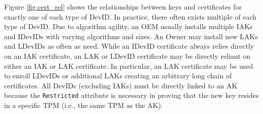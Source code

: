 Figure \ref{fig:cert_rel} shows the relationships between keys and certificates for exactly one of each type of DevID. In practice, there often exists multiple of each type of DevID. Due to algorithm agility, an OEM usually installs multiple IAKs and IDevIDs with varying algorithms and sizes. An Owner may install new LAKs and LDevIDs as often as need. While an IDevID certificate always relies directly on an IAK certificate, an LAK or LDevID certificate may be directly reliant on either an IAK or LAK certificate. In particular, an LAK certificate may be used to enroll LDevIDs or additional LAKs creating an arbitrary long chain of certificates. All DevIDs (excluding IAKs) must be directly linked to an AK because the \verb|Restricted| attribute is necessary in proving that the new key resides in a specific TPM (i.e., the same TPM as the AK).

